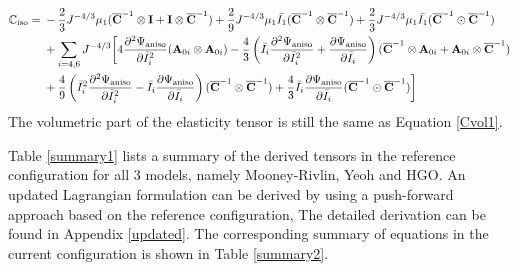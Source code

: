 \begin{equation} \label{Ciso3}
\begin{split}
\mathbb{C}_\mathrm{iso} = {}& 
- \frac{2}{3}J^{-4/3}\mu_1({\overline{\bold{C}}}^{-1} \otimes \bold{I} + \bold{I} \otimes {\overline{\bold{C}}}^{-1})  +
\frac{2}{9}J^{-4/3}\mu_1\bar{I_1} ( {\overline{\bold{C}}}^{-1} \otimes {\overline{\bold{C}}}^{-1}) + \frac{2}{3}J^{-4/3} \mu_1\bar{I_1} ({\overline{\bold{C}}}^{-1} \odot {\overline{\bold{C}}}^{-1})\\
&+ \sum_{i = 4, 6} J^{-4/3} \bigg[ 4\frac{\partial^2\Psi_\mathrm{aniso}}{\partial{\bar{I}_i}^2} (\bold{A}_{0i} \otimes \bold{A}_{0i}) - \frac{4}{3} \left( \bar{I}_i\frac{\partial^2\Psi_\mathrm{aniso}}{\partial{\bar{I}_i}^2} + \frac{\partial\Psi_\mathrm{aniso}}{\partial{\bar{I}_i}} \right) (\overline{\bold{C}}^{-1} \otimes \bold{A}_{0i} + \bold{A}_{0i} \otimes \overline{\bold{C}}^{-1}) \\
&+ \frac{4}{9} \left( {\bar{I}_i}^2\frac{\partial^2\Psi_\mathrm{aniso}}{\partial{\bar{I}_i}^2} - \bar{I}_i\frac{\partial\Psi_\mathrm{aniso}}{\partial{\bar{I}_i}} \right) (\overline{\bold{C}}^{-1} \otimes \overline{\bold{C}}^{-1} )
+ \frac{4}{3}\bar{I}_i \frac{\partial\Psi_\mathrm{aniso}}{\partial{\bar{I}_i}} (\overline{\bold{C}}^{-1} \odot \overline{\bold{C}}^{-1}) \bigg] 
\end{split}
\end{equation}
The volumetric part of the elasticity tensor is still the same as Equation \ref{Cvol1}.

Table \ref{summary1} lists a summary of the derived tensors in the reference configuration for all $3$ models, namely Mooney-Rivlin, Yeoh and HGO. An updated Lagrangian formulation can be derived by using a push-forward approach based on the reference configuration, The detailed derivation can be found in Appendix \ref{updated}. The corresponding summary of equations in the current configuration is shown in Table \ref{summary2}.






